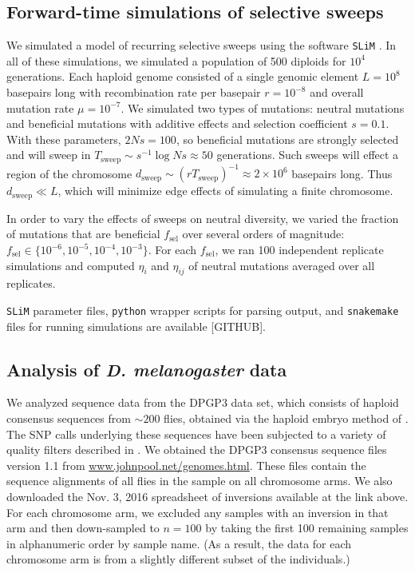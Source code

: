 \documentclass[11pt, letterpaper]{article}   	%
\begin{document}
\subsection*{Forward-time simulations of selective sweeps}

We simulated a model of recurring selective sweeps using the software \texttt{SLiM} \autocite{MesserEtAl201?}.
In all of these simulations, we simulated a population of 500 diploids for $10^4$ generations.
Each haploid genome consisted of a single genomic element $L=10^8$ basepairs long with recombination rate per basepair $r = 10^{-8}$ and overall mutation rate $\mu = 10^{-7}$.
We simulated two types of mutations: neutral mutations and beneficial mutations with additive effects and selection coefficient $s=0.1$.
With these parameters, $2Ns = 100$, so beneficial mutations are strongly selected and will sweep in $T_{\text{sweep}}\sim s^{-1} \log Ns \approx 50$ generations.
Such sweeps will effect a region of the chromosome $d_{\text{sweep}} \sim (r T_{\text{sweep}})^{-1} \approx 2 \times 10^6$ basepairs long.
Thus $d_{\text{sweep}} \ll L$, which will minimize edge effects of simulating a finite chromosome.

In order to vary the effects of sweeps on neutral diversity, we varied the fraction of mutations that are beneficial $f_{\text{sel}}$ over several orders of magnitude: $f_{\text{sel}} \in \{10^{-6}, 10^{-5}, 10^{-4}, 10^{-3}\}$.
For each $f_{\text{sel}}$, we ran 100 independent replicate simulations and computed $\eta_i$ and $\eta_{ij}$ of neutral mutations averaged over all replicates.

\texttt{SLiM} parameter files, \texttt{python} wrapper scripts for parsing output, and \texttt{snakemake} files for running simulations are available [GITHUB].

\subsection*{Analysis of \textit{D. melanogaster} data}

We analyzed sequence data from the DPGP3 data set, which consists of haploid consensus sequences from $\sim 200$ flies, obtained via the haploid embryo method of \cite{LangleyEtAl2011}.
The SNP calls underlying these sequences have been subjected to a variety of quality filters described in \cite{LackEtAl2015}.
We obtained the DPGP3 consensus sequence files version 1.1 from \url{www.johnpool.net/genomes.html}.
These files contain the sequence alignments of all flies in the sample on all chromosome arms.
We also downloaded the Nov. 3, 2016 spreadsheet of inversions available at the link above.
For each chromosome arm, we excluded any samples with an inversion in that arm and then down-sampled to $n=100$ by taking the first 100 remaining samples in alphanumeric order by sample name.
(As a result, the data for each chromosome arm is from a slightly different subset of the individuals.)
\end{document}
